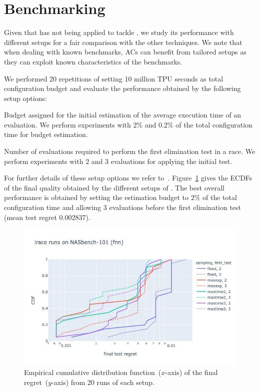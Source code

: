 \section{Benchmarking \irace}
Given that \irace has not being applied to tackle \nasbench, we study its performance with different setups for a fair comparison with the other \nasbench techniques. We note that when dealing with known benchmarks, ACs can benefit from tailored setups as they can exploit known characteristics of the benchmarks.


We performed 20 repetitions of \irace setting 10 million TPU seconds as total configuration budget and evaluate the performance obtained by the following setup options:

\begin{description}[style=unboxed, leftmargin=0px]
\item[Estimation budget] Budget assigned for the initial estimation of the average execution time of an evaluation. We perform experiments with 2\% and 0.2\% of the total configuration time for budget estimation.
\item[First test] Number of evaluations required to perform the first elimination test in a race. We perform experiments with 2 and 3 evaluations for applying the initial test.
\end{description}

For further details of these setup options we refer to~\cite{LopDubPerStuBir2016irace}. Figure~\ref{fig:irace-performance} gives the ECDFs of the final quality obtained by the different setups of \irace. The best overall performance is obtained by setting the estimation budget to $2\%$ of the total configuration time and allowing 3 evaluations before the first elimination test (mean test regret $0.002837$).
\begin{figure}[!t]
\centering
\includegraphics[width=\linewidth, clip=true, trim=30px 35px 0px 50px]{imgs/fnn-irace.png}
\caption{Empirical cumulative distribution function~($x$-axis) of the final regret~($y$-axis) from 20 runs of each \irace setup.}
\label{fig:irace-performance}
\end{figure}
